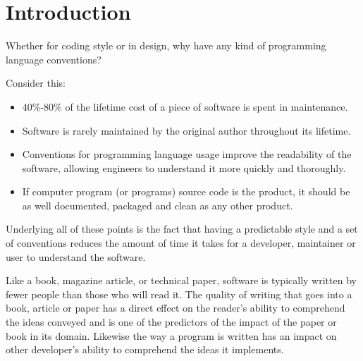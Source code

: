 \documentclass[fleqn,12pt]{PARCOneColumn} %
\affiliation{\textsuperscript{1}\textit{Computing Science Laboratory, Palo Alto Research Center}} %
\affiliation{*\textbf{Corresponding author}: glenn.scott@parc.com} %
\begin{document}
\flushbottom %
\maketitle %
\tableofcontents %

\thispagestyle{empty} %

\section*{Introduction} %

Whether for coding style or in design, why have any kind of programming language
conventions?

Consider this:
\begin{itemize}
\itemsep1pt\parskip0pt
\item
  40\%-80\% of the lifetime cost of a piece of software is spent in
  maintenance.  
\item
  Software is rarely maintained by the original author throughout its
  lifetime.
\item
  Conventions for programming language usage improve the readability of
  the software, allowing engineers to understand it more quickly and
  thoroughly.
\item
  If computer program (or programs) source code is the product, it should be as well documented, packaged and clean
  as any other product.
\end{itemize}

Underlying all of these points is the fact that having a predictable
style and a set of conventions reduces the amount of time it takes for a
developer, maintainer or user to understand the software.

Like a book, magazine article, or technical paper, software is
typically written by fewer people than those who will read it. The quality of
writing that goes into a book, article or paper has a direct effect on
the reader's ability to comprehend the ideas conveyed and is one of the
predictors of the impact of the paper or book in its domain. Likewise
the way a program is written has an impact on other developer's ability
to comprehend the ideas it implements.
\end{document}
